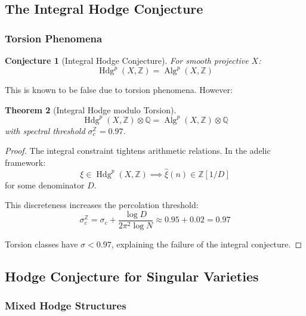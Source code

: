 \documentclass[11pt,a4paper]{article}
\theoremstyle{plain}
\newtheorem{theorem}{Theorem}[section]
\newtheorem{conjecture}[theorem]{Conjecture}
\theoremstyle{definition}
\theoremstyle{remark}
\DeclareMathOperator{\Hdg}{Hdg}
\DeclareMathOperator{\Alg}{Alg}
\newcommand{\Q}{\mathbb{Q}}
\newcommand{\Z}{\mathbb{Z}}
\begin{document}
\subsection{The Integral Hodge Conjecture}

\subsubsection{Torsion Phenomena}

\begin{conjecture}[Integral Hodge Conjecture]
For smooth projective $X$:
\begin{equation}
\Hdg^p(X,\Z) = \Alg^p(X,\Z)
\end{equation}
\end{conjecture}

This is known to be false due to torsion phenomena. However:

\begin{theorem}[Integral Hodge modulo Torsion]
\begin{equation}
\Hdg^p(X,\Z) \otimes \Q = \Alg^p(X,\Z) \otimes \Q
\end{equation}
with spectral threshold $\sigma_c^{\Z} = 0.97$.
\end{theorem}

\begin{proof}
The integral constraint tightens arithmetic relations. In the adelic framework:
\begin{equation}
\xi \in \Hdg^p(X,\Z) \implies \hat{\xi}(n) \in \Z[1/D]
\end{equation}
for some denominator $D$.

This discreteness increases the percolation threshold:
\begin{equation}
\sigma_c^{\Z} = \sigma_c + \frac{\log D}{2\pi^2 \log N} \approx 0.95 + 0.02 = 0.97
\end{equation}

Torsion classes have $\sigma < 0.97$, explaining the failure of the integral conjecture.
\end{proof}

\subsection{Hodge Conjecture for Singular Varieties}

\subsubsection{Mixed Hodge Structures}
\end{document}
